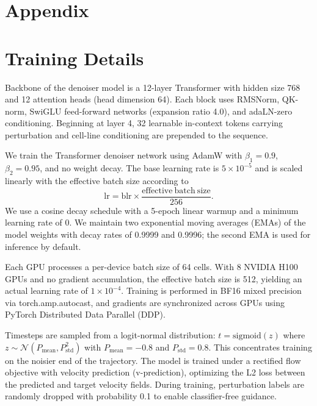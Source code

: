 \documentclass[11pt]{article}
\begin{document}
\clearpage
\appendix

\section*{Appendix}

\section{Training Details}

Backbone of the denoiser model is a 12-layer Transformer with hidden size 768 and 12 attention heads (head dimension 64). Each block uses RMSNorm, QK-norm, SwiGLU feed-forward networks (expansion ratio 4.0), and adaLN-zero conditioning. Beginning at layer 4, 32 learnable in-context tokens carrying perturbation and cell-line conditioning are prepended to the sequence.

We train the Transformer denoiser network using AdamW with $\beta_1 = 0.9$, $\beta_2 = 0.95$, and no weight decay. The base learning rate is $5 \times 10^{-5}$ and is scaled linearly with the effective batch size according to
\begin{equation}
  \mathrm{lr} = \mathrm{blr} \times \frac{\mathrm{effective\ batch\ size}}{256}.
\end{equation}
We use a cosine decay schedule with a 5-epoch linear warmup and a minimum learning rate of 0. We maintain two exponential moving averages (EMAs) of the model weights with decay rates of 0.9999 and 0.9996; the second EMA is used for inference by default.

Each GPU processes a per-device batch size of 64 cells. With 8 NVIDIA H100 GPUs and no gradient accumulation, the effective batch size is 512, yielding an actual learning rate of $1 \times 10^{-4}$. Training is performed in BF16 mixed precision via torch.amp.autocast, and gradients are synchronized across GPUs using PyTorch Distributed Data Parallel (DDP).

Timesteps are sampled from a logit-normal distribution: $t = \text{sigmoid}(z)$ where $z \sim \mathcal{N}(P_\text{mean}, P_\text{std}^2)$ with $P_\text{mean} = -0.8$ and $P_\text{std} = 0.8$. This concentrates training on the noisier end of the trajectory. The model is trained under a rectified flow objective with velocity prediction (v-prediction), optimizing the L2 loss between the predicted and target velocity fields. During training, perturbation labels are randomly dropped with probability 0.1 to enable classifier-free guidance.
\end{document}
